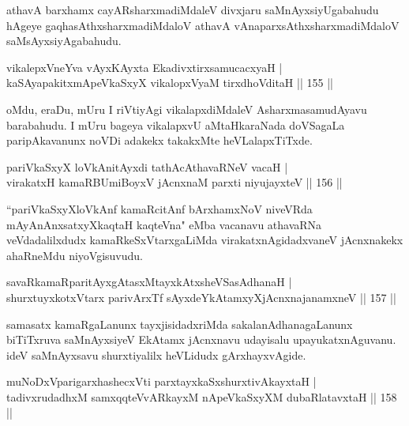 \begin{artha}
athavA barxhamx cayARsharxmadiMdaleV divxjaru saMnAyxsiyUgabahudu hAgeye gaqhasAthxsharxmadiMdaloV athavA vAnaparxsAthxsharxmadiMdaloV saMsAyxsiyAgabahudu.
\end{artha}

\begin{shl}
vikalepxVneYva vAyxKAyxta EkadivxtirxsamucacxyaH |\\
kaSAyapakitxmApeVkaSxyX vikalopxV\s yaM tirxdhoVditaH \hfill || 155 ||
\end{shl}

\begin{artha}
oMdu, eraDu, mUru I riVtiyAgi vikalapxdiMdaleV AsharxmasamudAyavu barabahudu. I mUru bageya vikalapxvU aMtaHkaraNada doVSagaLa paripAkavanunx noVDi adakekx takakxMte heVLalapxTiTxde.
\end{artha}

\begin{shl}
pariVkaSxyX loVkAnitAyxdi tathAcA\s \s thavaRNeV vacaH |\\
virakatxH kamaRBUmiBoyxV jAcnxnaM parxti niyujayxteV \hfill || 156 ||
\end{shl}

\begin{artha}
``pariVkaSxyXloVkAnf kamaRcitAnf bArxhamxNoV niveVRda mAyAnAnxsatxyXkaqtaH kaqteVna" eMba vacanavu athavaRNa veVdadalilxdudx kamaRkeSxVtarxgaLiMda virakatxnAgidadxvaneV jAcnxnakekx ahaRneMdu niyoVgisuvudu.
\end{artha}


\begin{shl}
savaRkamaRparitAyxgAtasxMtayxkAtxsheVSasAdhanaH |\\
shurxtuyxkotxV\s tarx parivArxTf sAyxdeYkAtamxyXjAcnxnajanamxneV \hfill || 157 ||
\end{shl}

\begin{artha}
samasatx kamaRgaLanunx tayxjisidadxriMda sakalanAdhanagaLanunx biTiTxruva saMnAyxsiyeV EkAtamx jAcnxnavu udayisalu upayukatxnAguvanu. ideV saMnAyxsavu shurxtiyalilx heVLidudx gArxhayxvAgide.
\end{artha}


\begin{shl}
muNoDxV\s parigarxhashecxVti parxtayxkaSxshurxtivAkayxtaH |\\
tadivxrudadhxM samxqqteVvARkayxM nApeVkaSxyXM dubaRlatavxtaH \hfill || 158 ||
\end{shl}

